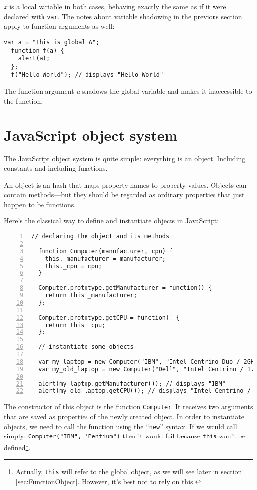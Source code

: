 \textit{x} is a local variable in both cases, behaving exactly the same as if
it were declared with \lstinline{var}.  The notes about variable shadowing in
the previous section apply to function arguments as well:

\begin{lstlisting}[nolol]
  var a = "This is global A";
  function f(a) {
    alert(a);
  };
  f("Hello World"); // displays "Hello World"
\end{lstlisting}

The function argument \textit{a} shadows the global variable and makes it
inaccessible to the function.

\section{JavaScript object system}\label{sec:objects}

The JavaScript object system is quite simple: everything is an object.
Including constants and including functions.

An object is an hash that maps property names to property values.  Objects can
contain methods—but they should be regarded as ordinary properties that just
happen to be functions.

Here's the classical way to define and instantiate objects in JavaScript:

\begin{lstlisting}[nolol,name=ObjectSample1,numbers=left]
  // declaring the object and its methods

  function Computer(manufacturer, cpu) {
    this._manufacturer = manufacturer;
    this._cpu = cpu;
  }

  Computer.prototype.getManufacturer = function() {
    return this._manufacturer;
  };

  Computer.prototype.getCPU = function() {
    return this._cpu;
  };

  // instantiate some objects

  var my_laptop = new Computer("IBM", "Intel Centrino Duo / 2GHz");
  var my_old_laptop = new Computer("Dell", "Intel Centrino / 1.7GHz");

  alert(my_laptop.getManufacturer()); // displays "IBM"
  alert(my_old_laptop.getCPU()); // displays "Intel Centrino / 1.7GHz"
\end{lstlisting}

The constructor of this object is the function \lstinline{Computer}.  It
receives two arguments that are saved as properties of the newly created
object.  In order to instantiate objects, we need to call the function using
the “\lstinline{new}” syntax.  If we would call simply: \lstinline{Computer("IBM", "Pentium")}
then it would fail because \lstinline{this} won't be
defined\footnote{Actually, \lstinline{this} will refer to the global object,
  as we will see later in section \ref{sec:FunctionObject}.  However, it's
  best not to rely on this.}.

